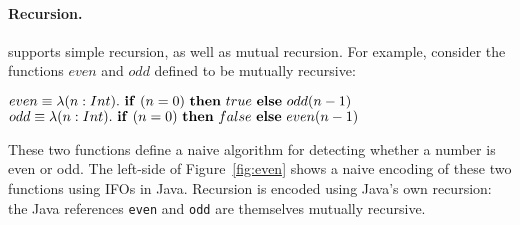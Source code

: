 \begin{comment}
\paragraph{Multi-argument Optimization}
To remove the inefficiencies that occur with multi-argument functions,
we propose a new optimisation technique. This optimisation technique
ensures that: multi-argument functions require only a constant amount
of memory; and only one \lstinline{apply} method call is needed for
calling multi-argument functions. 

To illustrate the idea of the optimisation, consider the definition of
\lstinline{tfact} on the right-side of Figure \ref{fig:multi}. 
There are two key differences to the definition on the left-side: 
1) the \lstinline{out} field in the first function is set
only once, at the initialisation of the object; 
2) there is only one call to \lstinline{apply()} in each recursive
iteration. The first difference builds on the observation that all 
the objects that are constructed in the recursive calls are the same. So we 
can effectively build a single object instead at the initialisation 
of the object. Since the second function object is now built at the
initialisation of the first function, the \lstinline{apply()} method
of the first function no longer does anything. Therefore, the second 
difference is to remove spurious \lstinline{apply()}
calls to the empty apply methods.
\end{comment}

\paragraph{Recursion.} \name supports simple recursion, as well as
mutual recursion. For example, consider the functions $even$ and $odd$
defined to be mutually recursive:

\vspace{5pt}
\noindent$even \equiv \lambda (n : Int).~{\bf if}~(n=0)~{\bf then}~true~{\bf  else}~odd(n-1)$ \\
\noindent$odd \equiv \lambda (n : Int).~{\bf if}~(n=0)~{\bf then}~false~{\bf else}~even(n-1)$
\vspace{5pt}

\noindent These two functions define a naive algorithm for detecting
whether a number is even or odd. The left-side of
Figure~\ref{fig:even} shows a naive encoding of these two
functions using IFOs in Java. Recursion is encoded using Java's own
recursion: the Java references \lstinline{even} and
\lstinline{odd} are themselves mutually recursive.

